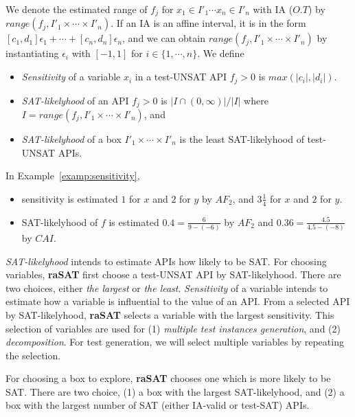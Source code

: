 \documentclass[runningheads,a4paper,oribibl]{llncs}
\begin{document}
We denote the estimated range of $f_j$ for $x_1 \in I'_1 \cdots x_n \in I'_n$ with IA ($O.T$)
by $range(f_j, I'_1 \times \cdots \times I'_n)$. 
If an IA is an affine interval, 
it is in the form $[c_1,d_1]\epsilon_1 + \cdots + [c_n,d_n]\epsilon_n$, 
and we can obtain $range(f_j, I'_1 \times \cdots \times I'_n)$ by instantiating $\epsilon_i$ with $[-1,1]$ for $i \in \{1, \cdots, n\}$. 
We define 
\begin{itemize} 

\item {\em Sensitivity} of a variable $x_i$ in a test-UNSAT API $f_j > 0$ is $max(|c_i|, |d_i|)$. 
\item {\em SAT-likelyhood} of an API $f_j > 0$ is $| I \cap (0,\infty) | / |I|$ where $I = range(f_j, I'_1 \times \cdots \times I'_n)$, and 
\item {\em SAT-likelyhood} of a box $I'_1 \times \cdots \times I'_n$ is 
the least SAT-likelyhood of test-UNSAT APIs. 
\end{itemize} 

\begin{example} \label{examp:SATlikelyhood}
In Example~\ref{examp:sensitivity}, 
\begin{itemize}
\item sensitivity is estimated $1$ for $x$ and $2$ for $y$ by $AF_2$, and $3\frac{1}{4}$ for $x$ and 
$2$ for $y$. 
\item SAT-likelyhood of $f$ is estimated $0.4= \frac{6}{9-(-6)}$ by $AF_2$ 
and $0.36 = \frac{4.5}{4.5-(-8)}$ by $CAI$. 
\end{itemize}
\end{example}


{\em SAT-likelyhood} intends to estimate APIs how likely to be SAT. 
For choosing variables, {\bf raSAT} first choose a test-UNSAT API by SAT-likelyhood. 
There are two choices, either {\em the largest} or {\em the least}. 
{\em Sensitivity} of a variable intends to estimate how a variable is influential to the value of an API. 
From a selected API by SAT-likelyhood, {\bf raSAT} selects a variable with the largest sensitivity. 
This selection of variables are used for (1) {\em multiple test instances generation}, and 
(2) {\em decomposition}. 
For test generation, we will select multiple variables by repeating the selection. 

For choosing a box to explore, {\bf raSAT} chooses one which is more likely to be SAT. 
There are two choice, (1) a box with the largest SAT-likelyhood, and 
(2) a box with the largest number of SAT (either IA-valid or test-SAT) APIs. 
\end{document}

